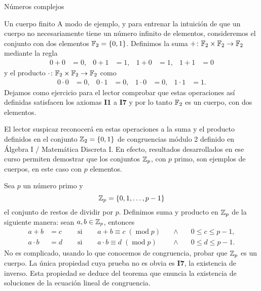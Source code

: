 \begin{chapter}{N\'umeros complejos}
    
    \begin{subsection}{Un cuerpo finito}
        A modo de ejemplo, y para entrenar la intuición de que un cuerpo no necesariamente tiene un número infinito de elementos, consideremos el conjunto con dos elementos $\mathbb F_2=\{0,1\}$. Definimos la suma $+\colon\mathbb F_2\times \mathbb F_2\to \mathbb F_2$ mediante la regla
        \begin{align*}
        0+0&=0, & 0+1&=1, & 1+0&=1, & 1+1&=0
        \end{align*}
        y el producto $\cdot \colon\mathbb F_2\times \mathbb F_2\to \mathbb F_2$ como 
        \begin{align*}
        0\cdot 0&=0, & 0\cdot 1&=0, & 1\cdot 0&=0, & 1\cdot 1&=1.
        \end{align*}
        Dejamos como ejercicio para el lector comprobar que estas operaciones así definidas satisfacen los axiomas \textbf{I1} a \textbf{I7} y por lo tanto $\mathbb F_2$ es un cuerpo, con dos elementos.
        
        \begin{observacion*}
            El lector suspicaz reconocerá en estas operaciones a la suma y el producto definidos en el conjunto $\mathbb Z_2=\{0,1\}$ de congruencias módulo 2  definido en Álgebra I / Matemática Discreta I. En efecto, resultados desarrollados en ese curso permiten demostrar que los conjuntos $\mathbb Z_p$, con $p$ primo, son ejemplos de cuerpos, en este caso con $p$ elementos.
        \end{observacion*}

        \begin{ejemplo*}
            Sea $p$ un número primo y
            $$
            \mathbb Z_p = \{0,1,\ldots, p-1\}
            $$
            el conjunto de restos de dividir por $p$. Definimos suma y producto en $\mathbb Z_p$ de la siguiente manera: sean $a,b \in \mathbb Z_p$,  entonces  
            \begin{equation*}
                \begin{array}{llllll}
                    a+b &= c\quad &\text{ si }\quad &a+b \equiv c \; (\operatorname{mod}p) \quad&\wedge\quad&0 \le c \le p-1,\\
                    a \cdot b &= d\quad &\text{ si }\quad &a\cdot b \equiv d \; (\operatorname{mod}p) &\wedge& 0 \le d \le p-1.
                \end{array} 
            \end{equation*}
            No es complicado, usando lo que conocemos de congruencia, probar que $\mathbb Z_p$  es un cuerpo. La única propiedad cuya prueba no es obvia es  \textbf{I7}, la existencia de inverso. Esta propiedad se deduce del teorema que enuncia la existencia de soluciones  de la ecuación lineal de congruencia. 
           

\end{ejemplo*}
\end{subsection}
\end{chapter}
